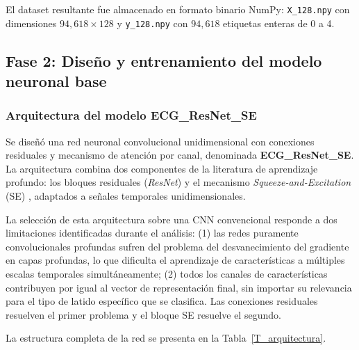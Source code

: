 El dataset resultante fue almacenado en formato binario NumPy: \texttt{X\_128.npy} con dimensiones $94{,}618 \times 128$ y \texttt{y\_128.npy} con $94{,}618$ etiquetas enteras de 0 a 4.

\subsection{Fase 2: Diseño y entrenamiento del modelo neuronal base}

\subsubsection{Arquitectura del modelo ECG\_ResNet\_SE}

Se diseñó una red neuronal convolucional unidimensional con conexiones residuales y mecanismo de atención por canal, denominada \textbf{ECG\_ResNet\_SE}. La arquitectura combina dos componentes de la literatura de aprendizaje profundo: los bloques residuales (\textit{ResNet}) \cite{He2016} y el mecanismo \textit{Squeeze-and-Excitation} (SE) \cite{Hu2018}, adaptados a señales temporales unidimensionales.

La selección de esta arquitectura sobre una CNN convencional responde a dos limitaciones identificadas durante el análisis: (1) las redes puramente convolucionales profundas sufren del problema del desvanecimiento del gradiente en capas profundas, lo que dificulta el aprendizaje de características a múltiples escalas temporales simultáneamente; (2) todos los canales de características contribuyen por igual al vector de representación final, sin importar su relevancia para el tipo de latido específico que se clasifica. Las conexiones residuales resuelven el primer problema y el bloque SE resuelve el segundo.

La estructura completa de la red se presenta en la Tabla~\ref{T_arquitectura}.

